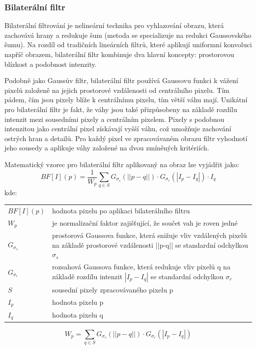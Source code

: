 \documentclass[male,czech,api_ing]{thesis}
\makeatletter
\newenvironment{conditions}[1][kde:]
    {#1 \begin{tabular}[t]{>{$}l<{$} @{${}={}$} >{\raggedright\arraybackslash}p{10cm}}}
    {\end{tabular}}
\makeatother
\begin{document}
\subsubsection{Bilaterální filtr}
Bilaterální filtrování je nelineární technika pro vyhlazování obrazu, která zachovává hrany a redukuje šum (metoda se specializuje na redukci Gaussovského šumu). Na rozdíl od tradičních lineárních filtrů, které aplikují uniformní konvoluci napříč obrazem, bilaterální filtr kombinuje dva hlavní koncepty: prostorovou blízkost a podobnost intenzity. 

Podobně jako Gaussův filtr, bilaterální filtr používá Gaussovu funkci k vážení pixelů založeně na jejich prostorové vzdálenosti od centrálního pixelu. Tím pádem, čím jsou pixely blíže k centrálnímu pixelu, tím větší váhu mají. Unikátní pro bilaterální filtr je fakt, že váhy jsou také přizpůsobeny na základě rozdílu intenzit mezi sousedními pixely a centrálním pixelem. Pixely s podobnou intenzitou jako centrální pixel získávají vyšší váhu, což umožňuje zachování ostrých hran a detailů. Pro každý pixel ve zpracovávaném obrazu filtr vyhodnotí jeho sousedy a aplikuje váhy založené na dvou zmíněných kritériích.\cite{BilateralFilter}

Matematický vzorec pro bilaterální filtr aplikovaný na obraz lze vyjádřit jako:
\begin{equation}
    BF[I](p) = \frac{1}{W_p} \sum_{q \in S} G_{\sigma_s}(||p-q||) \cdot G_{\sigma_r}(|I_p - I_q|) \cdot I_q
\end{equation}
\begin{conditions}
    BF[I](p) & hodnota pixelu po aplikaci bilaterálního filtru \\
    W_p & je normalizační faktor zajišťující, že součet vah je roven jedné \\
    G_{\sigma_s} & prostorová Gaussova funkce, která snižuje vliv vzdálených pixelů na základě prostorové vzdálenosti ||p-q|| se standardní odchylkou $\sigma_s$ \\
    G_{\sigma_r} & rozsahová Gaussova funkce, která redukuje vliv pixelů q na základě rozdílu intenzit $|I_p-I_q|$ se standardní odchylkou $\sigma_r$ \\
    S & sousední pixely zpracovávaného pixelu p \\
    I_p & hodnota pixelu p \\
    I_q & hodnota pixelu q \\
\end{conditions}

\begin{equation}
    W_p = \sum_{q \in S} G_{\sigma_s}(||p-q||) \cdot G_{\sigma_r}(|I_p - I_q|)
\end{equation}
\end{document}
